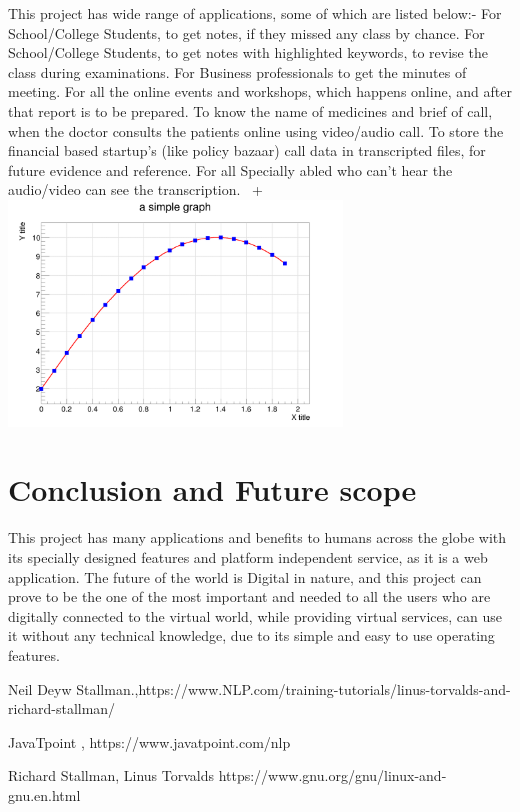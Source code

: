 \documentclass[conference]{IEEEtran}
\begin{document}
This project has wide range of applications, some of which are listed below:-
For School/College Students, to get notes, if they missed any class by chance.
For School/College Students, to get notes with highlighted keywords, to revise the class during examinations.
For Business professionals to get the minutes of meeting.
For all the online events and workshops, which happens online, and after that report is to be prepared.
To know the name of medicines and brief of call, when the doctor consults the patients online using video/audio call. 
To store the financial based startup’s (like policy bazaar) call data in transcripted files, for future evidence and reference.
For all Specially abled who can’t hear the audio/video can see the transcription.~\cite{NLP}
+
	\includegraphics[height=6cm]{graph.png}


\section*{Conclusion and Future scope}

This project has many applications and benefits to humans across the globe with its specially designed features and platform independent service, as it is a web application.
The future of the world is Digital in nature, and this project can prove to be the one of the most important and needed to all the users who are digitally connected to the virtual world, while providing virtual services, can use it without any technical knowledge, due to its simple and easy to use operating features.



	\begin{thebibliography} {}
	
	Neil Deyw Stallman.,https://www.NLP.com/training-tutorials/linus-torvalds-and-richard-stallman/
	
	JavaTpoint , https://www.javatpoint.com/nlp
	
	 Richard Stallman, Linus Torvalds https://www.gnu.org/gnu/linux-and-gnu.en.html
	
		\end{thebibliography}
	
\end{document}
